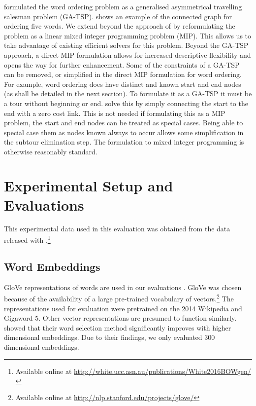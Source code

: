 {\textcite{Horvat2014} formulated the word ordering problem as a generalised asymmetrical travelling salesman problem (GA-TSP).  shows an example of the connected graph for ordering five words. We extend beyond the approach of \textcite{Horvat2014} by reformulating the problem as a linear mixed integer programming problem (MIP). This allows us to take advantage of existing efficient solvers for this problem. 
Beyond the GA-TSP approach, a direct MIP formulation allows for increased descriptive flexibility and opens the way for further enhancement. Some of the constraints of a GA-TSP can be removed, or simplified in the direct MIP formulation for word ordering.  For example, word ordering does have distinct and known start and end nodes (as shall be detailed in the next section). To formulate it as a GA-TSP it must be a tour without beginning or end. \textcite{Horvat2014} solve this by simply connecting the start to the end with a zero cost link. This is not needed if formulating this as a MIP problem, the start and end nodes can be treated as special cases. Being able to special case them as nodes known always to occur allows some simplification in the subtour elimination step. The formulation to mixed integer programming is otherwise reasonably standard.




\section{Experimental Setup and Evaluations} \label{evalsettings}
This experimental data used in this evaluation was
obtained from the data released with \textcite{White2015BOWgen}.\footnote{Available online at \url{http://white.ucc.asn.au/publications/White2016BOWgen/}}
\subsection{Word Embeddings}
GloVe representations of words are used in our evaluations \parencite{pennington2014glove}. GloVe was chosen because of the availability of a large pre-trained vocabulary of vectors.\footnote{Available online at \url{http://nlp.stanford.edu/projects/glove/}} The representations used for evaluation were pretrained on the 2014 Wikipedia and Gigaword 5.  Other vector representations are presumed to function similarly.
\textcite{White2015BOWgen} showed that their word selection method significantly improves with higher dimensional embeddings. Due to their findings, we only evaluated 300 dimensional embeddings.

}

